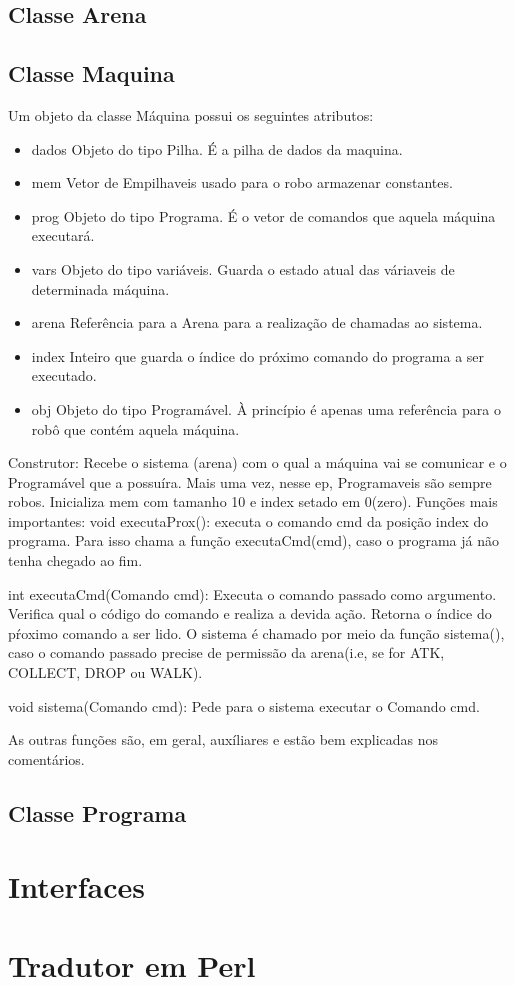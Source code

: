 \documentclass[11pt]{article}
\begin{document}
\subsection{Classe Arena}

\subsection{Classe Maquina}

Um objeto da classe Máquina possui os seguintes atributos:
\begin{itemize}

\item dados
	Objeto do tipo Pilha. É a pilha de dados da maquina.
\item mem
	Vetor de Empilhaveis usado para o robo armazenar constantes.
\item prog
	Objeto do tipo Programa. É o vetor de comandos que aquela máquina executará.
\item vars
	Objeto do tipo variáveis. Guarda o estado atual das váriaveis de determinada máquina.
\item arena
	Referência para a Arena para a realização de chamadas ao sistema.
\item index
	Inteiro que guarda o índice do próximo comando do programa a ser executado.
\item obj
	Objeto do tipo Programável. À princípio é apenas uma referência para o robô que contém aquela máquina.
\end{itemize}

Construtor: Recebe o sistema (arena) com o qual a máquina vai se comunicar e o Programável que a possuíra.
			Mais uma vez, nesse ep, Programaveis são sempre robos. Inicializa mem com tamanho 10 e index setado em 0(zero).
Funções mais importantes:
	void executaProx(): executa o comando cmd da posição index do programa. Para isso chama a função executaCmd(cmd), caso o programa já não tenha chegado ao fim.
	
	int executaCmd(Comando cmd): Executa o comando passado como argumento. Verifica  qual o código do comando e realiza a devida ação.
								 Retorna o índice do pŕoximo comando a ser lido. O sistema é chamado por meio da função sistema(), caso o comando passado precise de permissão da arena(i.e, se for ATK, COLLECT, DROP ou WALK).

	void sistema(Comando cmd):	 Pede para o sistema executar o Comando cmd.

	As outras funções são, em geral, auxíliares e estão bem explicadas nos comentários.

\subsection{Classe Programa}

\section{Interfaces}

\section{Tradutor em Perl}
\end{document}

